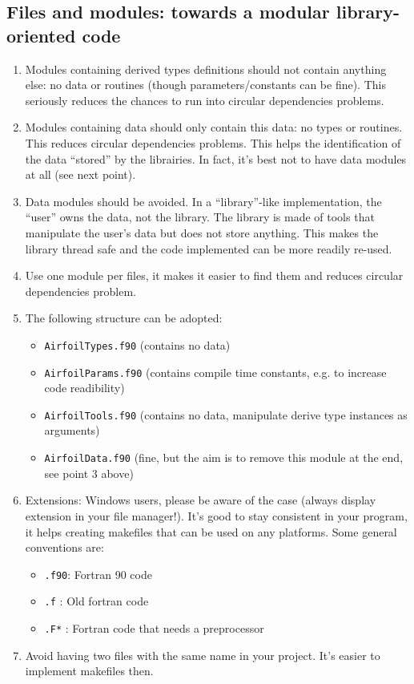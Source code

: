 \documentclass{article}
\begin{document}
\subsection{Files and modules: towards a modular library-oriented code}
\begin{enumerate}
    \item Modules containing derived types definitions should not contain anything else: no data or routines (though parameters/constants can be fine).  This seriously reduces the chances to run into circular dependencies problems. 
    \item Modules containing data should only contain this data: no types or routines. This reduces circular dependencies problems. This helps the identification of the data ``stored'' by the librairies. In fact, it's best not to have data modules at all (see next point).
    \item Data modules should be avoided. In a ``library''-like implementation, the ``user'' owns the data, not the library. The library is made of tools that manipulate the user's data but does not store anything. This makes the library thread safe and the code implemented can be more readily re-used.
    \item Use one module per files, it makes it easier to find them and reduces circular dependencies problem.
    \item The following structure can be adopted:
        \begin{itemize}
            \item \verb|AirfoilTypes.f90|  (contains no data)
            \item \verb|AirfoilParams.f90| (contains compile time constants, e.g. to increase code readibility)
            \item \verb|AirfoilTools.f90|  (contains no data, manipulate derive type instances as arguments)
            \item \verb|AirfoilData.f90| (fine, but the aim is to remove this module at the end, see point 3 above)
        \end{itemize}
    \item Extensions: Windows users, please be aware of the case (always display extension in your file manager!). It's good to stay consistent in your program, it helps creating makefiles that can be used on any platforms. Some general conventions are:
        \begin{itemize}
            \item \verb|.f90|: Fortran 90 code
            \item \verb|.f|  : Old fortran code
            \item \verb|.F*|  : Fortran code that needs a preprocessor
        \end{itemize}
    \item Avoid having two files with the same name in your project. It's easier to implement makefiles then.
\end{enumerate}
\end{document}
